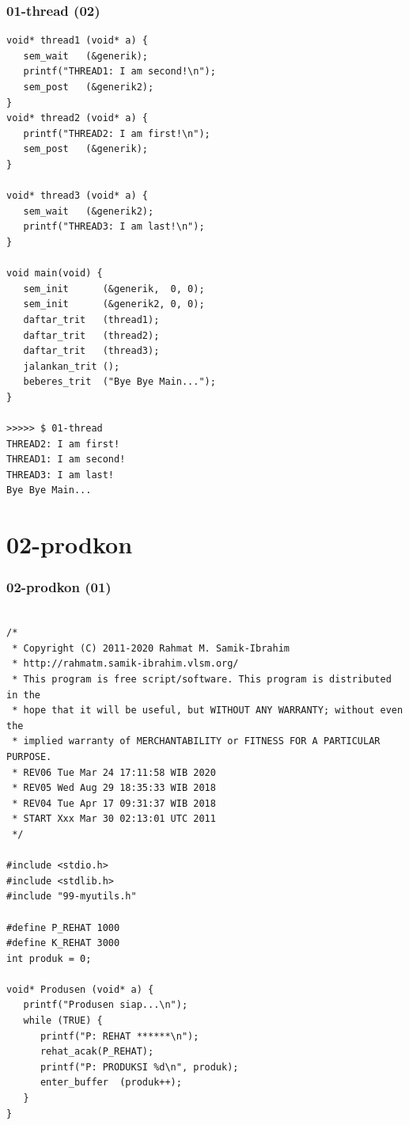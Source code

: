 \documentclass[aspectratio=169, xcolor=table, notheorems, hyperref={pdfpagelabels=false}]{beamer}
\begin{document}
\begin{frame}[fragile]
\frametitle{01-thread (02)}
\begin{lstlisting}[basicstyle=\ttfamily\tiny]
void* thread1 (void* a) {
   sem_wait   (&generik);
   printf("THREAD1: I am second!\n");
   sem_post   (&generik2);
}
void* thread2 (void* a) {
   printf("THREAD2: I am first!\n");
   sem_post   (&generik);
}

void* thread3 (void* a) {
   sem_wait   (&generik2);
   printf("THREAD3: I am last!\n");
}

void main(void) {
   sem_init      (&generik,  0, 0);
   sem_init      (&generik2, 0, 0);
   daftar_trit   (thread1);
   daftar_trit   (thread2);
   daftar_trit   (thread3);
   jalankan_trit ();
   beberes_trit  ("Bye Bye Main...");
}

>>>>> $ 01-thread 
THREAD2: I am first!
THREAD1: I am second!
THREAD3: I am last!
Bye Bye Main...

\end{lstlisting}
\end{frame}

\section{02-prodkon}
\begin{frame}[fragile]
\frametitle{02-prodkon (01)}
\begin{lstlisting}[basicstyle=\ttfamily\tiny]

/*
 * Copyright (C) 2011-2020 Rahmat M. Samik-Ibrahim
 * http://rahmatm.samik-ibrahim.vlsm.org/
 * This program is free script/software. This program is distributed in the 
 * hope that it will be useful, but WITHOUT ANY WARRANTY; without even the 
 * implied warranty of MERCHANTABILITY or FITNESS FOR A PARTICULAR PURPOSE.
 * REV06 Tue Mar 24 17:11:58 WIB 2020
 * REV05 Wed Aug 29 18:35:33 WIB 2018
 * REV04 Tue Apr 17 09:31:37 WIB 2018
 * START Xxx Mar 30 02:13:01 UTC 2011
 */

#include <stdio.h>
#include <stdlib.h>
#include "99-myutils.h"

#define P_REHAT 1000
#define K_REHAT 3000
int produk = 0;

void* Produsen (void* a) {
   printf("Produsen siap...\n");
   while (TRUE) {
      printf("P: REHAT ******\n");
      rehat_acak(P_REHAT);
      printf("P: PRODUKSI %d\n", produk);
      enter_buffer  (produk++);
   }
}

\end{lstlisting}
\end{frame}
\end{document}
